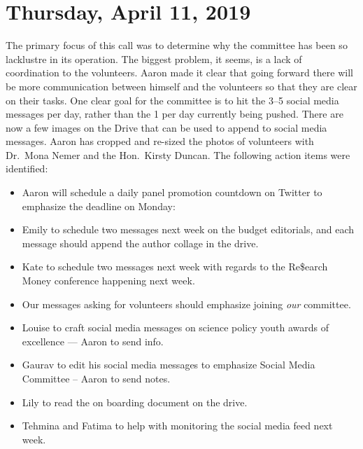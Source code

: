 \documentclass[12pt]{amsart}
\begin{document}
\section{Thursday, April 11, 2019}\label{mgt04}%
The primary focus of this call was to determine why the committee has been so lacklustre in its operation.
The biggest problem, it seems, is a lack of coordination to the volunteers.
Aaron made it clear that going forward there will be more communication between himself and the volunteers so that they are clear on their tasks.
One clear goal for the committee is to hit the 3--5 social media messages per day, rather than the 1 per day currently being pushed.
There are now a few images on the Drive that can be used to append to social media messages.
Aaron has cropped and re-sized the photos of volunteers with Dr.~Mona Nemer and the Hon.~Kirsty Duncan.
The following action items were identified:
\begin{itemize}
\item Aaron will schedule a daily panel promotion countdown on Twitter to emphasize the deadline on Monday: 
\item Emily to schedule two messages next week on the budget editorials, and each message should append the author collage in the drive.
\item Kate to schedule two messages next week with regards to the Re\$earch Money conference happening next week.
\item Our messages asking for volunteers should emphasize joining \emph{our} committee.
\item Louise to craft social media messages on science policy youth awards of excellence --- Aaron to send info.
\item Gaurav to edit his social media messages to emphasize Social Media Committee -- Aaron to send notes.
\item Lily to read the on boarding document on the drive.
\item Tehmina and Fatima to help with monitoring the social media feed next week.
\end{itemize}
\end{document}
